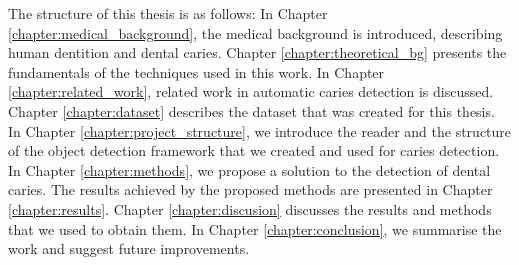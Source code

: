 The structure of this thesis is as follows: In Chapter \ref{chapter:medical_background}, the medical background is introduced, describing human dentition and dental caries. Chapter \ref{chapter:theoretical_bg} presents the fundamentals of the techniques used in this work. In Chapter \ref{chapter:related_work}, related work in automatic caries detection is discussed. Chapter \ref{chapter:dataset} describes the dataset that was created for this thesis. In Chapter \ref{chapter:project_structure}, we introduce the reader and the structure of the object detection framework that we created and used for caries detection. In Chapter \ref{chapter:methods}, we propose a solution to the detection of dental caries. The results achieved by the proposed methods are presented in Chapter \ref{chapter:results}. Chapter \ref{chapter:discusion} discusses the results and methods that we used to obtain them. In Chapter \ref{chapter:conclusion}, we summarise the work and suggest future improvements.


